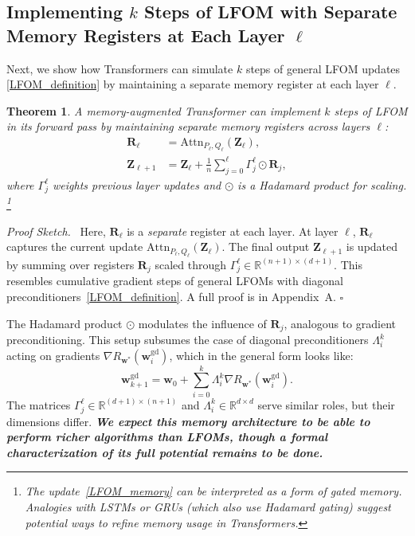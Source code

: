 \documentclass[11pt]{article}
\theoremstyle{plain}
\newtheorem{theorem}{Theorem}[section]
\theoremstyle{definition}
\theoremstyle{remark}
\newenvironment{proofsketch}{\par\noindent\textit{Proof Sketch.}\ }{\hfill$\square$\par}
\newcommand{\bemph}[1]{\textbf{\emph{#1}}}
\numberwithin{equation}{section}
\begin{document}
\subsection{Implementing \texorpdfstring{$k$}{k} Steps of LFOM with Separate Memory Registers at Each Layer \(\ell\)}
\label{Sec:LFOM-mem}
Next, we show how Transformers can simulate \(k\) steps of general LFOM updates \eqref{LFOM_definition} by maintaining a separate memory register at each layer \(\ell\).
\begin{theorem}\label{Proposition 2}
A memory-augmented Transformer can implement \(k\) steps of LFOM in its forward pass by maintaining separate memory registers across layers \(\ell\):
\begin{align}
    \mathbf{R}_\ell &= \mathrm{Attn}_{P_\ell, Q_\ell}(\mathbf{Z}_\ell), \\
    \mathbf{Z}_{\ell+1} &= \mathbf{Z}_\ell + \frac{1}{n} \sum_{j=0}^{\ell} \Gamma_j^\ell \odot \mathbf{R}_j, \label{LFOM_memory}
\end{align}
where \(\Gamma_j^\ell\) weights previous layer updates and \(\odot\) is a Hadamard product for scaling.
\footnote{The update~\eqref{LFOM_memory} can be interpreted as a form of \emph{gated memory}. Analogies with LSTMs or GRUs (which also use Hadamard gating) suggest potential ways to refine memory usage in Transformers.}
\end{theorem}
\begin{proofsketch}
Here, \(\mathbf{R}_\ell\) is a \emph{separate} register at each layer. At layer \(\ell\), \(\mathbf{R}_\ell\) captures the current update \(\mathrm{Attn}_{P_\ell, Q_\ell}(\mathbf{Z}_\ell)\). The final output \(\mathbf{Z}_{\ell+1}\) is updated by summing over registers \(\mathbf{R}_j\) scaled through \(\Gamma_j^\ell \in \mathbb R^{(n+1)\times (d+1)}\). This resembles cumulative gradient steps of general LFOMs with diagonal preconditioners~\eqref{LFOM_definition}. A full proof is in Appendix~A.
\end{proofsketch}
The Hadamard product \( \odot \) modulates the influence of \( \mathbf{R}_j \), analogous to gradient preconditioning. This setup subsumes the case of diagonal preconditioners \( \Lambda_i^k \) acting on gradients \( \nabla R_{\mathbf{w}^*}(\mathbf{w}_i^{\mathrm{gd}}) \), which in the general form looks like:
\begin{equation}
\mathbf{w}_{k+1}^{\mathrm{gd}} = \mathbf{w}_0 + \sum_{i=0}^k \Lambda_i^k \nabla R_{\mathbf{w}^*}(\mathbf{w}_i^{\mathrm{gd}}).
\label{lfom_diag_updates}
\end{equation}
The matrices \( \Gamma_j^\ell \in \mathbb{R}^{(d + 1) \times (n + 1)} \) and \( \Lambda_i^k \in \mathbb{R}^{d \times d} \) serve similar roles, but their dimensions differ. \bemph{We expect this memory architecture to be able to perform richer algorithms than LFOMs, though a formal characterization of its full potential remains to be done.}
\noindent
\end{document}
